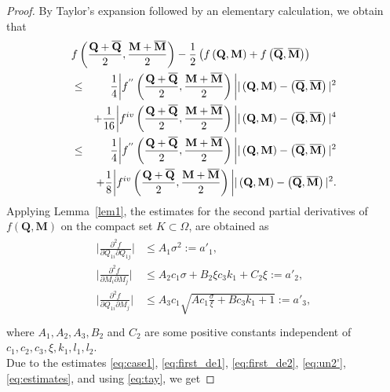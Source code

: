 \documentclass[10pt,a4paper]{amsart}
\def \Mvec{\mathbf{M}}
\def\Qvec{\mathbf{Q}}
\begin{document}
\begin{proof}
By Taylor's expansion followed by an elementary calculation, we obtain that
\begin{eqnarray}\label{eq:un2'}
\lefteqn{
f\left(\frac{\Qvec+\overline{\Qvec}}{2}, \frac{\Mvec+\overline{\Mvec}}{2}\right)-\frac{1}{2}\left(f\left(\Qvec, \Mvec\right) + f\left(\overline{\Qvec}, \overline{\Mvec}\right)\right)}\nonumber\\
&\le& \frac{1}{4}\bigg|f^{''}\left(\frac{\Qvec+\overline{\Qvec}}{2}, \frac{\Mvec+\overline{\Mvec}}{2}\right)\bigg||\left(\Qvec, \Mvec\right)-\left(\overline{\Qvec}, \overline{\Mvec}\right)|^2 \nonumber\\
&&+\frac{1}{16}\bigg|f^{iv}\left(\frac{\Qvec+\overline{\Qvec}}{2}, \frac{\Mvec+\overline{\Mvec}}{2}\right)\bigg||\left(\Qvec, \Mvec\right)-\left(\overline{\Qvec}, \overline{\Mvec}\right)|^4\nonumber\\
&\le& \frac{1}{4}\bigg|f^{''}\left(\frac{\Qvec+\overline{\Qvec}}{2}, \frac{\Mvec+\overline{\Mvec}}{2}\right)\bigg||\left(\Qvec, \Mvec\right)-\left(\overline{\Qvec}, \overline{\Mvec}\right)|^2 \nonumber\\ && +\frac{1}{8}\bigg|f^{iv}\left(\frac{\Qvec+\overline{\Qvec}}{2}, \frac{\Mvec+\overline{\Mvec}}{2}\right)\bigg||\left(\Qvec, \Mvec\right)-\left(\overline{\Qvec}, \overline{\Mvec}\right)|^2.\nonumber\\
\end{eqnarray}
Applying Lemma~\ref{lem1}, the estimates for the second partial derivatives of $f\left(\Qvec, \Mvec\right)$ on the compact set $K\subset\Omega$, are obtained as 
\begin{eqnarray}
\begin{aligned}
\bigg|\frac{\partial^2 f}{\partial Q_{1i}\partial Q_{1j}}\bigg|&\le A_1\sigma^2:=a'_1,\\
\biggl|\frac{\partial^2 f}{\partial M_{i}\partial M_{j}}\biggr|&\le A_2c_1\sigma+B_2\xi c_3k_1+C_2\xi:=a'_2,\\
\biggl|\frac{\partial^2 f}{\partial Q_{1i}\partial M_{j}}\biggr|&\le A_3c_1\sqrt{Ac_1\frac{\sigma}{\xi}+Bc_3k_1+1 }:=a'_3,\\
\end{aligned}\label{eq:estimates}
\end{eqnarray}
where $A_1, A_2, A_3, B_2$ and $C_2$ are some positive constants independent of $c_1, c_2, c_3, \xi, k_1, l_1, l_2$.\newline\\
Due to the estimates \eqref{eq:case1}, \eqref{eq:first_de1}, \eqref{eq:first_de2}, \eqref{eq:un2'}, \eqref{eq:estimates}, and using \eqref{eq:tay}, we get

\end{proof}
\end{document}
